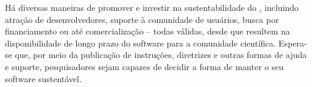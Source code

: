 Há diversas maneiras de promover e investir na sustentabilidade do \RS, incluindo atração de desenvolvedores, suporte à comunidade de usuários, busca por financiamento ou até comercialização -- todas válidas, desde que resultem na disponibilidade de longo prazo do software para a comunidade científica. 
Espera-se que, por meio da publicação de instruções, diretrizes e outras formas de ajuda e suporte, pesquisadores sejam capazes de decidir a forma de manter o seu software sustentável.


